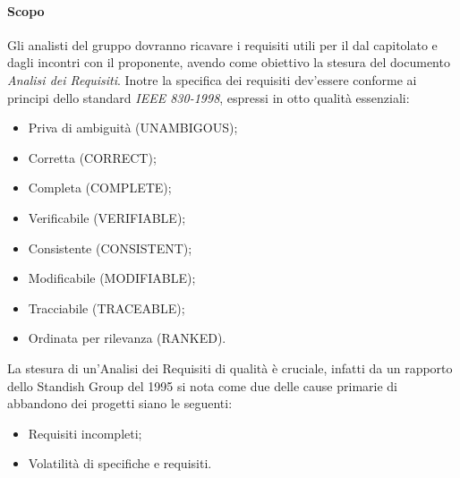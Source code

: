 			\paragraph*{Scopo}
				Gli analisti del gruppo dovranno ricavare i requisiti utili per il 
				dal capitolato e dagli incontri con il proponente, avendo come obiettivo la
				stesura del documento \textit{Analisi dei Requisiti}.
			        Inotre la specifica dei requisiti dev'essere conforme ai principi dello standard \textit{IEEE 830-1998}, espressi in otto qualit\`a
			        essenziali:
				\begin{itemize}
				\item Priva di ambiguit\`a (UNAMBIGOUS);
				\item Corretta (CORRECT);
				\item Completa (COMPLETE);
				\item Verificabile (VERIFIABLE);
				\item Consistente (CONSISTENT);
				\item Modificabile (MODIFIABLE);
				\item Tracciabile (TRACEABLE);
				\item Ordinata per rilevanza (RANKED).
				\end{itemize}
			        La stesura di un'Analisi dei Requisiti di qualit\`a \`e cruciale, infatti
			        da un rapporto dello Standish Group del 1995 si nota come due delle cause primarie
			        di abbandono dei progetti siano le seguenti:
				\begin{itemize}
				\item Requisiti incompleti;
				\item Volatilità di specifiche e requisiti.
				\end{itemize}
			
			
